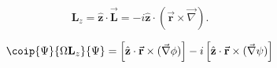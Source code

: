 \documentclass[onecolumn,,amsmath,amssymb,nofootinbib,floatfix]{revtex4}
\begin{document}
$$\textbf{L}_z = \hat{\textbf{z}}\cdot \vec{\textbf{L}} = -i\hat{\textbf{z}}\cdot (\vec{\textbf{r}}\times\vec{\nabla}).$$

$$\coip{\Psi}{\Omega \textbf{L}_z}{\Psi} = \left[\hat{\textbf{z}}\cdot\vec{\textbf{r}}\times(\vec{\nabla}\phi)\right]-i\left[\hat{\textbf{z}}\cdot\vec{\textbf{r}}\times(\vec{\nabla}\psi)\right]$$
\end{document}
